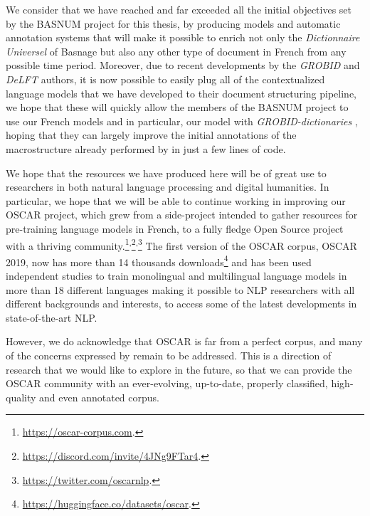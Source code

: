We consider that we have reached and far exceeded all the initial objectives set by the BASNUM project for this thesis, by producing models and automatic annotation systems that will make it possible to enrich not only the \emph{Dictionnaire Universel} of Basnage but also any other type of document in French from any possible time period. Moreover, due to recent developments by the \emph{GROBID} \citep{lopez-etal-2018-grobid} and \emph{DeLFT} \citep{lopez-etal-2018-delft} authors, it is now possible to easily plug all of the contextualized language models that we have developed to their document structuring pipeline, we hope that these will quickly allow the members of the BASNUM project to use our French models and in particular, our \dalembert model with \emph{GROBID-dictionaries} \citep{khemakhem-etal-2017-automatic,khemakhem-etal-2018-enhancing}, hoping that they can largely improve the initial annotations of the macrostructure already performed by \citet{khemakhem-2020-standard} in just a few lines of code.

We hope that the resources we have produced here will be of great use to researchers in both natural language processing and digital humanities. In particular, we hope that we will be able to continue working in improving our OSCAR project, which grew from a side-project intended to gather resources for pre-training language models in French, to a fully fledge Open Source project with a thriving community.\footnote{\url{https://oscar-corpus.com}.}\textsuperscript{,}\footnote{\url{https://discord.com/invite/4JNg9FTar4}.}\textsuperscript{,}\footnote{\url{https://twitter.com/oscarnlp}.} The first version of the OSCAR corpus, OSCAR 2019, now has more than 14 thousands downloads\footnote{\url{https://huggingface.co/datasets/oscar}.} and has been used independent studies to train monolingual and multilingual language models in more than 18 different languages \citep{antoun-etal-2021-araelectra, kakwani-etal-2020-indicnlpsuite, wilie-etal-2020-indonlu, chan-etal-2020-germans, koutsikakis-etal-2020-greek, martin-etal-2020-camembert, chriqui-etal-2021-hebert, seker-etal-2021-alephbert, delobelle-etal-2020-robbert, dumitrescu-etal-2020-birth, masala-etal-2020-robert} making it possible to NLP researchers with all different backgrounds and interests, to access some of the latest developments in state-of-the-art NLP.

However, we do acknowledge that OSCAR is far from a perfect corpus, and many of the concerns expressed by \citet{caswell-etal-2020-language,kreutzer-etal-2021-quality} remain to be addressed. This is a direction of research that we would like to explore in the future, so that we can provide the OSCAR community with an ever-evolving, up-to-date, properly classified, high-quality and even annotated corpus.

